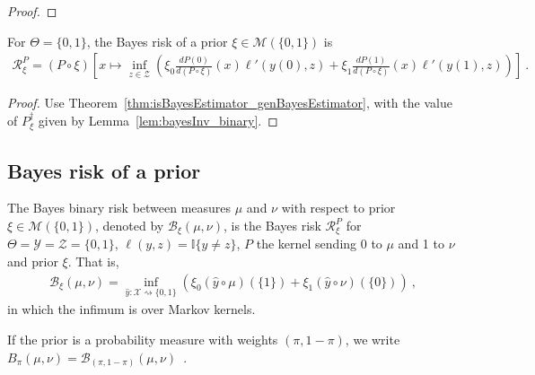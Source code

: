 \begin{proof}\mathlibok
{}

\end{proof}

\begin{lemma}
  \label{lem:bayesRisk_binary}
  \leanok
  For $\Theta = \{0,1\}$, the Bayes risk of a prior $\xi \in \mathcal M(\{0,1\})$ is
  \begin{align*}
  \mathcal R^P_\xi = (P \circ \xi)\left[x \mapsto \inf_{z \in \mathcal Z} \left( \xi_0\frac{d P(0)}{d(P \circ \xi)}(x)\ell'(y(0), z) + \xi_1\frac{d P(1)}{d(P \circ \xi)}(x)\ell'(y(1), z) \right) \right]
  \: .
  \end{align*}
\end{lemma}

\begin{proof}\leanok
{}
Use Theorem~\ref{thm:isBayesEstimator_genBayesEstimator}, with the value of $P_\xi^\dagger$ given by Lemma~\ref{lem:bayesInv_binary}.
\end{proof}



\subsection{Bayes risk of a prior}

\begin{definition}
  \label{def:bayesBinaryRisk}
  \leanok
  The Bayes binary risk between measures $\mu$ and $\nu$ with respect to prior $\xi \in \mathcal M(\{0,1\})$, denoted by $\mathcal B_\xi(\mu, \nu)$, is the Bayes risk $\mathcal R^P_\xi$ for $\Theta = \mathcal Y = \mathcal Z = \{0,1\}$, $\ell(y,z) = \mathbb{I}\{y \ne z\}$, $P$ the kernel sending 0 to $\mu$ and 1 to $\nu$ and prior $\xi$.
  That is,
  \begin{align*}
  \mathcal B_\xi(\mu, \nu) = \inf_{\hat{y} : \mathcal X \rightsquigarrow \{0,1\}}\left(\xi_0 (\hat{y} \circ \mu)(\{1\}) + \xi_1 (\hat{y} \circ \nu)(\{0\})\right)
  \: ,
  \end{align*}
  in which the infimum is over Markov kernels.

  If the prior is a probability measure with weights $(\pi, 1 - \pi)$, we write $B_\pi(\mu, \nu) = \mathcal B_{(\pi, 1 - \pi)}(\mu, \nu)$~.
\end{definition}

